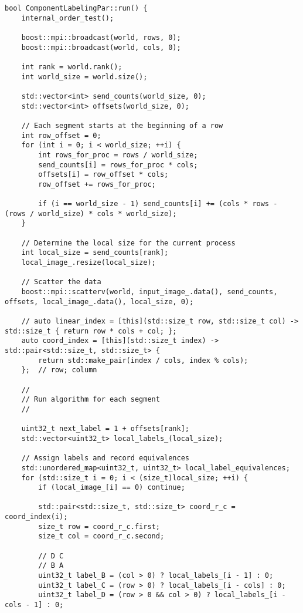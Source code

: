 \documentclass[a4paper,12pt]{article}
\begin{document}
\begin{lstlisting}
bool ComponentLabelingPar::run() {
    internal_order_test();
    
    boost::mpi::broadcast(world, rows, 0);
    boost::mpi::broadcast(world, cols, 0);
    
    int rank = world.rank();
    int world_size = world.size();
    
    std::vector<int> send_counts(world_size, 0);
    std::vector<int> offsets(world_size, 0);
    
    // Each segment starts at the beginning of a row
    int row_offset = 0;
    for (int i = 0; i < world_size; ++i) {
        int rows_for_proc = rows / world_size;
        send_counts[i] = rows_for_proc * cols;
        offsets[i] = row_offset * cols;
        row_offset += rows_for_proc;
    
        if (i == world_size - 1) send_counts[i] += (cols * rows - (rows / world_size) * cols * world_size);
    }
    
    // Determine the local size for the current process
    int local_size = send_counts[rank];
    local_image_.resize(local_size);
    
    // Scatter the data
    boost::mpi::scatterv(world, input_image_.data(), send_counts, offsets, local_image_.data(), local_size, 0);
    
    // auto linear_index = [this](std::size_t row, std::size_t col) -> std::size_t { return row * cols + col; };
    auto coord_index = [this](std::size_t index) -> std::pair<std::size_t, std::size_t> {
        return std::make_pair(index / cols, index % cols);
    };  // row; column
    
    //
    // Run algorithm for each segment
    //
    
    uint32_t next_label = 1 + offsets[rank];
    std::vector<uint32_t> local_labels_(local_size);
    
    // Assign labels and record equivalences
    std::unordered_map<uint32_t, uint32_t> local_label_equivalences;
    for (std::size_t i = 0; i < (size_t)local_size; ++i) {
        if (local_image_[i] == 0) continue;
    
        std::pair<std::size_t, std::size_t> coord_r_c = coord_index(i);
        size_t row = coord_r_c.first;
        size_t col = coord_r_c.second;
    
        // D C
        // B A
        uint32_t label_B = (col > 0) ? local_labels_[i - 1] : 0;
        uint32_t label_C = (row > 0) ? local_labels_[i - cols] : 0;
        uint32_t label_D = (row > 0 && col > 0) ? local_labels_[i - cols - 1] : 0;
    

\end{lstlisting}
\end{document}
